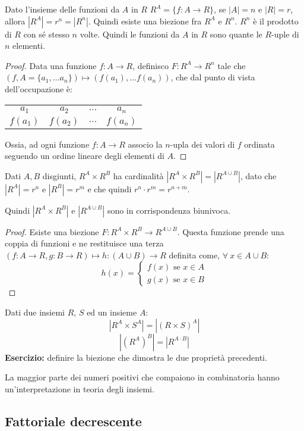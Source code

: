 \begin{prop}
Dato l'insieme delle funzioni da $A$ in $R$ $R^A = \{ f : A \to R\}$, se $|A| = n$ e $|R| = r$, allora $|R^A| = r^n = |R^n|$. Quindi esiste una biezione fra $R^A$ e $R^n$. $R^n$ \`e il prodotto di $R$ con s\'e stesso $n$ volte. Quindi le funzioni da $A$ in $R$ sono quante le $R$-uple di $n$ elementi.
\end{prop}
\begin{proof}
Data una funzione $f : A \to R$, definisco $F : R^A \to R^n$ tale che $(f, A = \{ a_1, \dots a_n\}) \mapsto (f(a_1), \dots f(a_n))$, che dal punto di vista dell'occupazione \`e:

\begin{tabular}{cccc}
$a_1$ & $a_2$ & $\dots$ & $a_n$ \\
$f(a_1)$ & $f(a_2)$ & $\dots$ & $f(a_n)$ 
\end{tabular}

Ossia, ad ogni funzione $f : A \to R$ associo la $n$-upla dei valori di $f$ ordinata seguendo un ordine lineare degli elementi di $A$.
\end{proof}
\begin{prop}
Dati $A, B$ disgiunti, $R^A \times R^B$ ha cardinalit\`a $|R^A \times R^B| = |R^{A \cup B}|$, dato che $|R^A| = r^n$ e $|R^B| = r^m$ e che quindi $r^n \cdot r^m = r^{n + m}$.

Quindi $|R^A \times R^B| $ e $ |R^{A \cup B}|$ sono in corrispondenza biunivoca.
\end{prop}
\begin{proof}
Esiste una biezione $F : R^A \times R^B \to R^{A \cup B}$. Questa funzione prende una coppia di funzioni e ne restituisce una terza $(f : A \to R, g: B \to R) \mapsto h : (A \cup B) \to R$ definita come, $\forall \ x \in A \cup B$:
\[
h(x) = 
\begin{cases}
f(x) \text{ se } x \in A\\
g(x) \text{ se } x \in B
\end{cases}
\]
\end{proof}
Dati due insiemi $R$, $S$ ed un insieme $A$:
\[
|R^A \times S^A| = |(R \times S)^A|
\]
\[
|(R^A)^B| = |R^{A \cdot B}|
\]
\textbf{Esercizio:} definire la biezione che dimostra le due propriet\`a precedenti.
\vspace{5cm}

La maggior parte dei numeri positivi che compaiono in combinatoria hanno un'interpretazione in teoria degli insiemi.

\subsection{Fattoriale decrescente}

